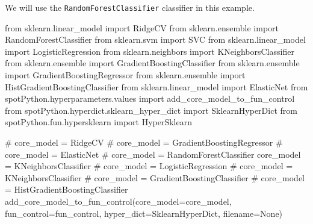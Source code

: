 \documentclass[
  letterpaper,
  DIV=11,
  numbers=noendperiod]{scrreprt}
\newenvironment{Shaded}{\begin{snugshade}}{\end{snugshade}}
\newcommand{\CommentTok}[1]{\textcolor[rgb]{0.37,0.37,0.37}{#1}}
\newcommand{\ImportTok}[1]{\textcolor[rgb]{0.00,0.46,0.62}{#1}}
\newcommand{\NormalTok}[1]{\textcolor[rgb]{0.00,0.23,0.31}{#1}}
\newcommand{\OperatorTok}[1]{\textcolor[rgb]{0.37,0.37,0.37}{#1}}
\newcommand{\VariableTok}[1]{\textcolor[rgb]{0.07,0.07,0.07}{#1}}
\begin{document}
We will use the \texttt{RandomForestClassifier} classifier in this
example.

\begin{Shaded}
\begin{Highlighting}[]
\ImportTok{from}\NormalTok{ sklearn.linear\_model }\ImportTok{import}\NormalTok{ RidgeCV}
\ImportTok{from}\NormalTok{ sklearn.ensemble }\ImportTok{import}\NormalTok{ RandomForestClassifier}
\ImportTok{from}\NormalTok{ sklearn.svm }\ImportTok{import}\NormalTok{ SVC}
\ImportTok{from}\NormalTok{ sklearn.linear\_model }\ImportTok{import}\NormalTok{ LogisticRegression}
\ImportTok{from}\NormalTok{ sklearn.neighbors }\ImportTok{import}\NormalTok{ KNeighborsClassifier}
\ImportTok{from}\NormalTok{ sklearn.ensemble }\ImportTok{import}\NormalTok{ GradientBoostingClassifier}
\ImportTok{from}\NormalTok{ sklearn.ensemble }\ImportTok{import}\NormalTok{ GradientBoostingRegressor}
\ImportTok{from}\NormalTok{ sklearn.ensemble }\ImportTok{import}\NormalTok{ HistGradientBoostingClassifier}
\ImportTok{from}\NormalTok{ sklearn.linear\_model }\ImportTok{import}\NormalTok{ ElasticNet}
\ImportTok{from}\NormalTok{ spotPython.hyperparameters.values }\ImportTok{import}\NormalTok{ add\_core\_model\_to\_fun\_control}
\ImportTok{from}\NormalTok{ spotPython.hyperdict.sklearn\_hyper\_dict }\ImportTok{import}\NormalTok{ SklearnHyperDict}
\ImportTok{from}\NormalTok{ spotPython.fun.hypersklearn }\ImportTok{import}\NormalTok{ HyperSklearn}
\end{Highlighting}
\end{Shaded}

\begin{Shaded}
\begin{Highlighting}[]
\CommentTok{\# core\_model  = RidgeCV}
\CommentTok{\# core\_model = GradientBoostingRegressor}
\CommentTok{\# core\_model = ElasticNet}
\CommentTok{\# core\_model = RandomForestClassifier}
\NormalTok{core\_model }\OperatorTok{=}\NormalTok{ KNeighborsClassifier}
\CommentTok{\# core\_model = LogisticRegression}
\CommentTok{\# core\_model = KNeighborsClassifier}
\CommentTok{\# core\_model = GradientBoostingClassifier}
\CommentTok{\# core\_model = HistGradientBoostingClassifier}
\NormalTok{add\_core\_model\_to\_fun\_control(core\_model}\OperatorTok{=}\NormalTok{core\_model,}
\NormalTok{                              fun\_control}\OperatorTok{=}\NormalTok{fun\_control,}
\NormalTok{                              hyper\_dict}\OperatorTok{=}\NormalTok{SklearnHyperDict,}
\NormalTok{                              filename}\OperatorTok{=}\VariableTok{None}\NormalTok{)}
\end{Highlighting}
\end{Shaded}
\end{document}
